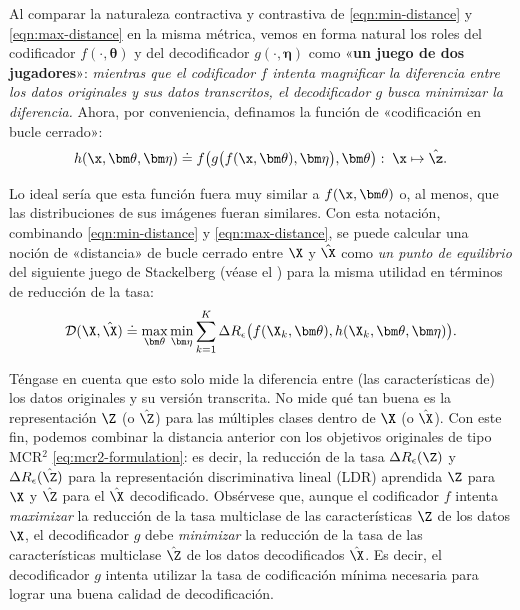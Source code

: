 \documentclass[../../book-main_es.tex]{subfiles}
\begin{document}
Al comparar la naturaleza contractiva y contrastiva de
\eqref{eqn:min-distance} y \eqref{eqn:max-distance} en la misma
métrica, vemos en forma natural los roles del codificador $f(\cdot, \bm
\theta)$ y del decodificador $g(\cdot, \bm \eta)$ como 
«{\bf un juego de dos jugadores}»: {\em mientras que el codificador $f$ 
    intenta magnificar la diferencia entre los datos originales y sus datos transcritos, el
decodificador $g$ busca minimizar la diferencia.} Ahora, por conveniencia,
definamos la función de «codificación en bucle cerrado»:
\begin{equation}
    h(\x, \bm \theta,\bm \eta) \doteq f\big(g\big(f(\x, \bm \theta),
    \bm \eta\big), \bm \theta\big): \; \x \mapsto \hat \z.
\end{equation}

Lo ideal sería que esta función fuera muy similar a $f(\x, \bm
\theta)$ o, al menos, que las distribuciones de sus imágenes fueran
similares. Con esta notación, combinando \eqref{eqn:min-distance} y
\eqref{eqn:max-distance}, se puede calcular una noción de «distancia» de bucle cerrado
entre $\X$ y $\hat \X$ como {\em un punto de equilibrio} del 
siguiente juego de Stackelberg (véase el ) para
la misma utilidad en términos de reducción de la tasa:
\begin{equation}
    \mathcal{D}(\X, \hat \X) \doteq  \max_{\bm \theta} \min_{\bm
    \eta} \sum_{k=1}^K \Delta R_\epsilon\big(f(\X_k,\bm \theta),
    h(\X_k,\bm \theta,\bm \eta)\big).
    \label{eq:MCR2-GAN-pair}
\end{equation}

Téngase en cuenta que esto solo mide la diferencia entre (las características de)
los datos originales y su versión transcrita. No mide
qué tan buena es la representación $\Z$ (o $\hat \Z$) para las múltiples
clases dentro de $\X$ (o $\hat \X$). Con este fin, podemos combinar la
distancia anterior con los objetivos originales de tipo MCR$^2$
\eqref{eq:mcr2-formulation}: es decir, la reducción de la tasa $\Delta
R_\epsilon(\Z)$ y $\Delta R_\epsilon(\hat \Z)$ para la representación discriminativa lineal (LDR)
aprendida $\Z$ para $\X$ y $\hat \Z$ para el $\hat \X$ decodificado. Obsérvese que,
aunque el codificador $f$ intenta {\em maximizar} la reducción de la tasa multiclase
de las características $\Z$ de los datos $\X$, el decodificador $g$
debe {\em minimizar} la reducción de la tasa de las características multiclase
$\hat \Z$ de los datos decodificados $\hat \X$. Es decir, el decodificador $g$ intenta
utilizar la tasa de codificación mínima necesaria para lograr una buena calidad de decodificación.
\end{document}
